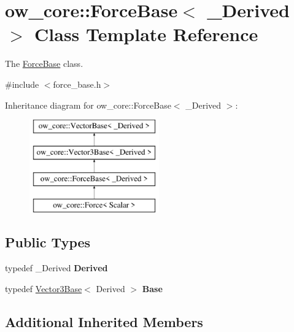 \hypertarget{classow__core_1_1ForceBase}{}\section{ow\+\_\+core\+:\+:Force\+Base$<$ \+\_\+\+Derived $>$ Class Template Reference}
\label{classow__core_1_1ForceBase}


The \hyperlink{classow__core_1_1ForceBase}{Force\+Base} class.  




{\ttfamily \#include $<$force\+\_\+base.\+h$>$}

Inheritance diagram for ow\+\_\+core\+:\+:Force\+Base$<$ \+\_\+\+Derived $>$\+:\begin{figure}[H]
\begin{center}
\leavevmode
\includegraphics[height=4.000000cm]{de/daf/classow__core_1_1ForceBase}
\end{center}
\end{figure}
\subsection*{Public Types}
\begin{DoxyCompactItemize}
\item 
typedef \+\_\+\+Derived {\bfseries Derived}\hypertarget{classow__core_1_1ForceBase_a1c4df30624ff05c042d57a810e63a8f2}{}\label{classow__core_1_1ForceBase_a1c4df30624ff05c042d57a810e63a8f2}

\item 
typedef \hyperlink{classow__core_1_1Vector3Base}{Vector3\+Base}$<$ Derived $>$ {\bfseries Base}\hypertarget{classow__core_1_1ForceBase_a80f1f902f9abc084a63a75a0bb5fb40e}{}\label{classow__core_1_1ForceBase_a80f1f902f9abc084a63a75a0bb5fb40e}

\end{DoxyCompactItemize}
\subsection*{Additional Inherited Members}


